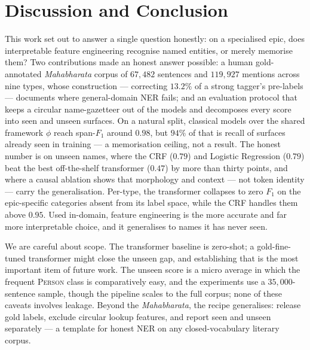\documentclass[conference]{IEEEtran}
\begin{document}
\section{Discussion and Conclusion}
\label{sec:discussion}

This work set out to answer a single question honestly: on a specialised epic, does interpretable feature engineering recognise named entities, or merely memorise them? Two contributions made an honest answer possible: a human gold-annotated \emph{Mahabharata} corpus of $67{,}482$ sentences and $119{,}927$ mentions across nine types, whose construction --- correcting $13.2\%$ of a strong tagger's pre-labels --- documents where general-domain NER fails; and an evaluation protocol that keeps a circular name-gazetteer out of the models and decomposes every score into seen and unseen surfaces. On a natural split, classical models over the shared framework $\phi$ reach span-$F_1$ around $0.98$, but $94\%$ of that is recall of surfaces already seen in training --- a memorisation ceiling, not a result. The honest number is on unseen names, where the CRF ($0.79$) and Logistic Regression ($0.79$) beat the best off-the-shelf transformer ($0.47$) by more than thirty points, and where a causal ablation shows that morphology and context --- not token identity --- carry the generalisation. Per-type, the transformer collapses to zero $F_1$ on the epic-specific categories absent from its label space, while the CRF handles them above $0.95$. Used in-domain, feature engineering is the more accurate and far more interpretable choice, and it generalises to names it has never seen.

We are careful about scope. The transformer baseline is zero-shot; a gold-fine-tuned transformer might close the unseen gap, and establishing that is the most important item of future work. The unseen score is a micro average in which the frequent \textsc{Person} class is comparatively easy, and the experiments use a $35{,}000$-sentence sample, though the pipeline scales to the full corpus; none of these caveats involves leakage. Beyond the \emph{Mahabharata}, the recipe generalises: release gold labels, exclude circular lookup features, and report seen and unseen separately --- a template for honest NER on any closed-vocabulary literary corpus.
\end{document}

